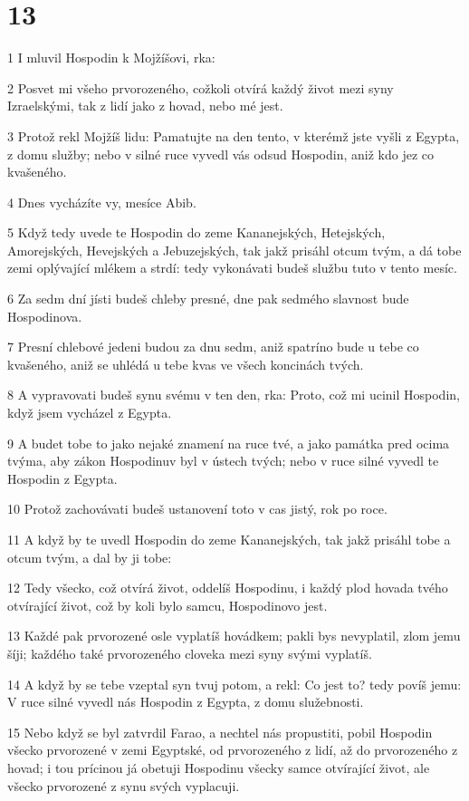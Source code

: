 \chapter{13}

\par 1 I mluvil Hospodin k Mojžíšovi, rka:
\par 2 Posvet mi všeho prvorozeného, cožkoli otvírá každý život mezi syny Izraelskými, tak z lidí jako z hovad, nebo mé jest.
\par 3 Protož rekl Mojžíš lidu: Pamatujte na den tento, v kterémž jste vyšli z Egypta, z domu služby; nebo v silné ruce vyvedl vás odsud Hospodin, aniž kdo jez co kvašeného.
\par 4 Dnes vycházíte vy, mesíce Abib.
\par 5 Když tedy uvede te Hospodin do zeme Kananejských, Hetejských, Amorejských, Hevejských a Jebuzejských, tak jakž prisáhl otcum tvým, a dá tobe zemi oplývající mlékem a strdí: tedy vykonávati budeš službu tuto v tento mesíc.
\par 6 Za sedm dní jísti budeš chleby presné, dne pak sedmého slavnost bude Hospodinova.
\par 7 Presní chlebové jedeni budou za dnu sedm, aniž spatríno bude u tebe co kvašeného, aniž se uhlédá u tebe kvas ve všech koncinách tvých.
\par 8 A vypravovati budeš synu svému v ten den, rka: Proto, což mi ucinil Hospodin, když jsem vycházel z Egypta.
\par 9 A budet tobe to jako nejaké znamení na ruce tvé, a jako památka pred ocima tvýma, aby zákon Hospodinuv byl v ústech tvých; nebo v ruce silné vyvedl te Hospodin z Egypta.
\par 10 Protož zachovávati budeš ustanovení toto v cas jistý, rok po roce.
\par 11 A když by te uvedl Hospodin do zeme Kananejských, tak jakž prisáhl tobe a otcum tvým, a dal by ji tobe:
\par 12 Tedy všecko, což otvírá život, oddelíš Hospodinu, i každý plod hovada tvého otvírající život, což by koli bylo samcu, Hospodinovo jest.
\par 13 Každé pak prvorozené osle vyplatíš hovádkem; pakli bys nevyplatil, zlom jemu šíji; každého také prvorozeného cloveka mezi syny svými vyplatíš.
\par 14 A když by se tebe vzeptal syn tvuj potom, a rekl: Co jest to? tedy povíš jemu: V ruce silné vyvedl nás Hospodin z Egypta, z domu služebnosti.
\par 15 Nebo když se byl zatvrdil Farao, a nechtel nás propustiti, pobil Hospodin všecko prvorozené v zemi Egyptské, od prvorozeného z lidí, až do prvorozeného z hovad; i tou prícinou já obetuji Hospodinu všecky samce otvírající život, ale všecko prvorozené z synu svých vyplacuji.
